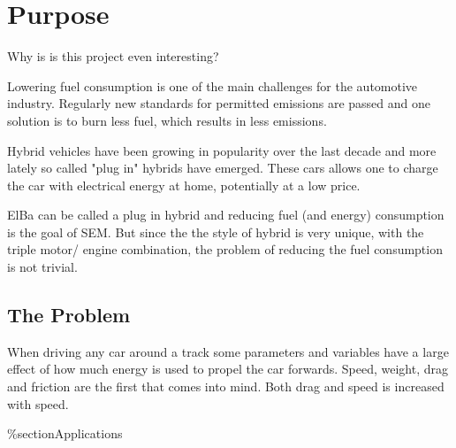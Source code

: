 \chapter{Purpose}

Why is is this project even interesting?

Lowering fuel consumption is one of the main challenges for the automotive 
industry. Regularly new standards for permitted emissions are passed and  
one solution is to burn less fuel, which results in less emissions.

Hybrid vehicles have been growing in popularity over the last decade and 
more lately so called "plug in" hybrids have emerged. These cars allows one 
to charge the car with electrical energy at home, potentially at a low price.

ElBa can be called a plug in hybrid and reducing fuel (and energy) consumption is the goal of SEM. But since the the style of hybrid is very unique, with the triple motor/ engine combination, the problem of reducing the fuel consumption is not trivial. 

\section{The Problem}
When driving any car around a track some parameters and variables have a large effect of how much energy is used to propel the car forwards. Speed, weight, drag and friction are the first that comes into mind. Both drag and speed is increased with speed.
  
\%section{Applications}
